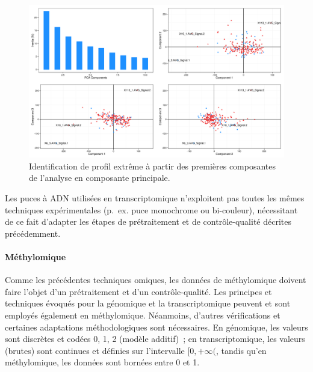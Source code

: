 \documentclass[11pt,a4paper,notrimn]{krantz}
\let\oldparagraph\paragraph
\renewcommand{\paragraph}[1]{\oldparagraph{#1}\mbox{}}
\theoremstyle{definition}
\theoremstyle{definition}
\theoremstyle{remark}
\begin{document}
\begin{figure}[!htb]

{\centering \includegraphics[width=6in]{FiguresTables/pcaexpr} 

}

\caption{Identification de profil extrême à partir des premières
composantes de l'analyse en composante principale.}\label{fig:pcaexpr}
\end{figure}

Les puces à ADN utilisées en transcriptomique n'exploitent pas toutes
les mêmes techniques expérimentales (p.~ex. puce monochrome ou
bi-couleur), nécessitant de ce fait d'adapter les étapes de
prétraitement et de contrôle-qualité décrites précédemment.

\clearpage

\paragraph{Méthylomique}\label{methylomiquePT}

Comme les précédentes techniques omiques, les données de méthylomique
doivent faire l'objet d'un prétraitement et d'un contrôle-qualité. Les
principes et techniques évoqués pour la génomique et la transcriptomique
peuvent et sont employés également en méthylomique. Néanmoins, d'autres
vérifications et certaines adaptations méthodologiques sont nécessaires.
En génomique, les valeurs sont discrètes et codées 0, 1, 2 (modèle
additif)~; en transcriptomique, les valeurs (brutes) sont continues et
définies sur l'intervalle \([0, +\infty(\), tandis qu'en méthylomique,
les données sont bornées entre 0 et 1.
\end{document}
